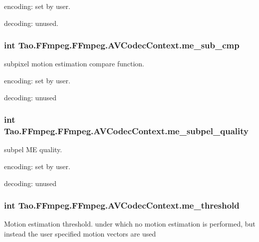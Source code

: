\begin{DoxyItemize}
\item encoding: set by user.
\item decoding: unused. 
\end{DoxyItemize}\hypertarget{struct_tao_1_1_f_fmpeg_1_1_f_fmpeg_1_1_a_v_codec_context_ad46dba74d772967ebe85d77720284876}{
\subsubsection[{me\_\-sub\_\-cmp}]{\setlength{\rightskip}{0pt plus 5cm}int {\bf Tao.FFmpeg.FFmpeg.AVCodecContext.me\_\-sub\_\-cmp}}}
\label{struct_tao_1_1_f_fmpeg_1_1_f_fmpeg_1_1_a_v_codec_context_ad46dba74d772967ebe85d77720284876}
subpixel motion estimation compare function.
\begin{DoxyItemize}
\item encoding: set by user.
\item decoding: unused 
\end{DoxyItemize}\hypertarget{struct_tao_1_1_f_fmpeg_1_1_f_fmpeg_1_1_a_v_codec_context_a5478fd89aa95295579576f87b69878b5}{
\subsubsection[{me\_\-subpel\_\-quality}]{\setlength{\rightskip}{0pt plus 5cm}int {\bf Tao.FFmpeg.FFmpeg.AVCodecContext.me\_\-subpel\_\-quality}}}
\label{struct_tao_1_1_f_fmpeg_1_1_f_fmpeg_1_1_a_v_codec_context_a5478fd89aa95295579576f87b69878b5}
subpel ME quality.
\begin{DoxyItemize}
\item encoding: set by user.
\item decoding: unused 
\end{DoxyItemize}\hypertarget{struct_tao_1_1_f_fmpeg_1_1_f_fmpeg_1_1_a_v_codec_context_a7655069d77b5fe638abf7f8ae54a1f26}{
\subsubsection[{me\_\-threshold}]{\setlength{\rightskip}{0pt plus 5cm}int {\bf Tao.FFmpeg.FFmpeg.AVCodecContext.me\_\-threshold}}}
\label{struct_tao_1_1_f_fmpeg_1_1_f_fmpeg_1_1_a_v_codec_context_a7655069d77b5fe638abf7f8ae54a1f26}
Motion estimation threshold. under which no motion estimation is performed, but instead the user specified motion vectors are used


